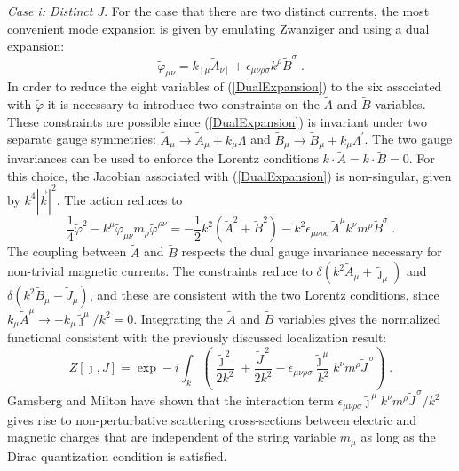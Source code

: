 \documentclass[a4paper,a4paper]{article}
\begin{document}
{\it Case i: Distinct $J$}.  For the case that there are two distinct currents, the most convenient mode expansion is given by emulating Zwanziger and using a dual expansion:
\begin{equation}
\label{DualExpansion}
\tilde{\varphi}_{\mu \nu} = k_{\left[ \mu \right.} \tilde{A}_{\left. \nu \right]} +  \epsilon_{\mu \nu \rho \sigma} k^\rho \tilde{B}^\sigma \; .
\end{equation}
In order to reduce the eight variables of (\ref{DualExpansion}) to the six associated with $\tilde{\varphi}$ it is necessary to introduce two constraints on the $\tilde{A}$ and $\tilde{B}$ variables.  These constraints are possible since (\ref{DualExpansion}) is invariant under two separate gauge symmetries: $\tilde{A}_\mu \rightarrow \tilde{A}_\mu + k_\mu \Lambda$ and  $\tilde{B}_\mu \rightarrow \tilde{B}_\mu + k_\mu \Lambda^\prime$.  The two gauge invariances can be used to enforce the Lorentz conditions $k \cdot \tilde{A} = k \cdot \tilde{B} = 0$.  For this choice, the Jacobian associated with (\ref{DualExpansion}) is non-singular, given by $k^4 |\vec{k}|^2$.  The action reduces to
\begin{equation}
\label{DualAction}
\frac{1}{4} \tilde{\varphi}^2 - k^\mu \tilde{\varphi}_{\mu \nu} m_\rho \tilde{\varphi}^{ \rho \nu}  = - \frac{1}{2} k^2 ( \tilde{A}^2 + \tilde{B}^2 ) -  k^2 \epsilon_{\mu \nu \rho \sigma} \tilde{A}^\mu k^\nu m^\rho \tilde{B}^\sigma \; .
\end{equation}
The coupling between $\tilde{A}$ and $\tilde{B}$ respects the dual gauge invariance necessary for non-trivial magnetic currents.  The constraints reduce to $\delta( k^2 \tilde{A}_\mu + \tilde{\jmath}_\mu)$ and $\delta( k^2 \tilde{B}_\mu - \tilde{J}_\mu )$, and these are consistent with the two Lorentz conditions, since $k_\mu \tilde{A}^\mu \rightarrow - k_\mu \tilde{\jmath}^\mu / k^2  =  0 $. Integrating the $\tilde{A}$ and $\tilde{B}$ variables gives the normalized functional consistent with the previously discussed localization result:
\begin{equation}
\label{FinalFunctional}
Z[ \jmath, J] = \exp - i \int_k \left( \frac{\tilde{\jmath}^{\, 2}}{2k^2} + \frac{\tilde{J}^{\, 2}}{2k^2} -  \epsilon_{\mu \nu \rho \sigma} \frac{\tilde{\jmath}^{\, \mu}}{k^2} k^\nu m^\rho \tilde{J}^{\, \sigma} \right) \; .
\end{equation}
Gamsberg and Milton \cite{GamsbergMilton} have shown that the interaction term $\epsilon_{\mu \nu \rho \sigma} \tilde{\jmath}^{\, \mu} k^\nu m^\rho \tilde{J}^{\, \sigma}/ k^2$ gives rise to non-perturbative scattering cross-sections between electric and magnetic charges that are independent of the string variable $m_\mu$ as long as the Dirac quantization condition is satisfied.
\end{document}
